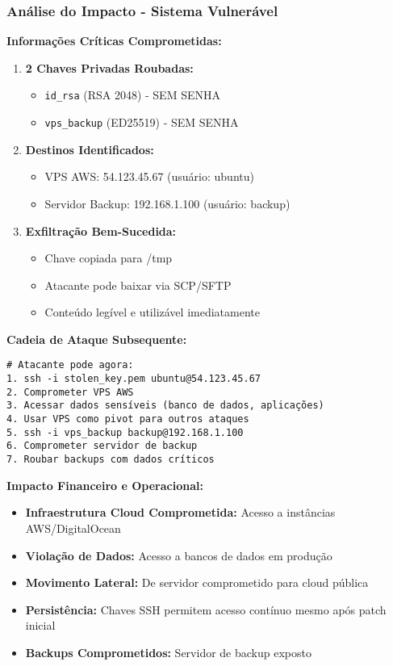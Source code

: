 \documentclass[12pt]{article}
\begin{document}
\subsubsection{Análise do Impacto - Sistema Vulnerável}

\textbf{Informações Críticas Comprometidas:}
\begin{enumerate}
    \item \textbf{2 Chaves Privadas Roubadas:}
        \begin{itemize}
            \item \texttt{id\_rsa} (RSA 2048) - SEM SENHA
            \item \texttt{vps\_backup} (ED25519) - SEM SENHA
        \end{itemize}
    
    \item \textbf{Destinos Identificados:}
        \begin{itemize}
            \item VPS AWS: 54.123.45.67 (usuário: ubuntu)
            \item Servidor Backup: 192.168.1.100 (usuário: backup)
        \end{itemize}
    
    \item \textbf{Exfiltração Bem-Sucedida:}
        \begin{itemize}
            \item Chave copiada para /tmp
            \item Atacante pode baixar via SCP/SFTP
            \item Conteúdo legível e utilizável imediatamente
        \end{itemize}
\end{enumerate}

\textbf{Cadeia de Ataque Subsequente:}
\begin{verbatim}
# Atacante pode agora:
1. ssh -i stolen_key.pem ubuntu@54.123.45.67
2. Comprometer VPS AWS
3. Acessar dados sensíveis (banco de dados, aplicações)
4. Usar VPS como pivot para outros ataques
5. ssh -i vps_backup backup@192.168.1.100
6. Comprometer servidor de backup
7. Roubar backups com dados críticos
\end{verbatim}

\textbf{Impacto Financeiro e Operacional:}
\begin{itemize}
    \item \textbf{Infraestrutura Cloud Comprometida:} Acesso a instâncias AWS/DigitalOcean
    \item \textbf{Violação de Dados:} Acesso a bancos de dados em produção
    \item \textbf{Movimento Lateral:} De servidor comprometido para cloud pública
    \item \textbf{Persistência:} Chaves SSH permitem acesso contínuo mesmo após patch inicial
    \item \textbf{Backups Comprometidos:} Servidor de backup exposto
\end{itemize}
\end{document}
